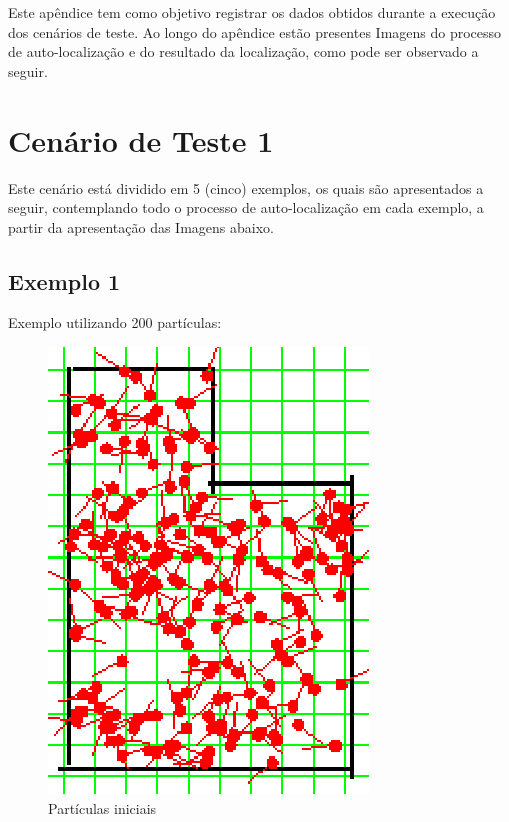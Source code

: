 
Este apêndice tem como objetivo registrar os dados obtidos durante a execução dos cenários de teste. Ao longo do apêndice estão presentes
Imagens do processo de auto-localização e do resultado da localização, como pode ser observado a seguir.

\section{Cenário de Teste 1}

Este cenário está dividido em 5 (cinco) exemplos, os quais são apresentados a seguir, contemplando todo o processo de auto-localização
em cada exemplo, a partir da apresentação das Imagens abaixo.

\subsection{Exemplo 1}

Exemplo utilizando 200 partículas:

\begin{figure}[H]
  \centering
  \includegraphics[scale=0.6]{figuras/cen1_ex1/1.eps}
  \caption[Partículas Iniciais]{Partículas iniciais}
  \label{img:cen1_ex1_1}
\end{figure}


